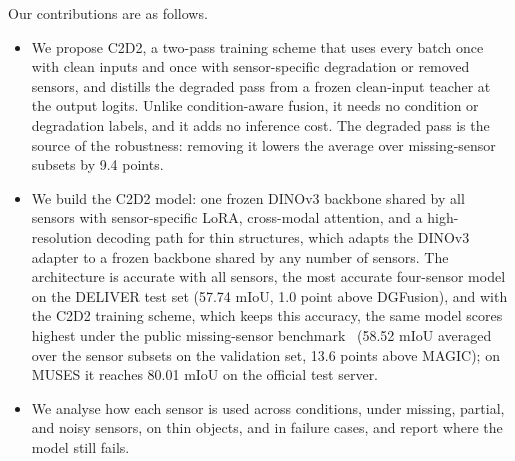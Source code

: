 Our contributions are as follows.
\begin{itemize}
\item We propose C2D2, a two-pass training scheme that uses every batch once with clean inputs and once with sensor-specific degradation or removed sensors, and distills the degraded pass from a frozen clean-input teacher at the output logits. Unlike condition-aware fusion, it needs no condition or degradation labels, and it adds no inference cost. The degraded pass is the source of the robustness: removing it lowers the average over missing-sensor subsets by 9.4 points.
\item We build the C2D2 model: one frozen DINOv3 backbone shared by all sensors with sensor-specific LoRA, cross-modal attention, and a high-resolution decoding path for thin structures, which adapts the DINOv3 adapter to a frozen backbone shared by any number of sensors. The architecture is accurate with all sensors, the most accurate four-sensor model on the DELIVER test set (57.74 mIoU, 1.0 point above DGFusion), and with the C2D2 training scheme, which keeps this accuracy, the same model scores highest under the public missing-sensor benchmark~\cite{mmssbench2025} (58.52 mIoU averaged over the sensor subsets on the validation set, 13.6 points above MAGIC); on MUSES it reaches 80.01 mIoU on the official test server.
\item We analyse how each sensor is used across conditions, under missing, partial, and noisy sensors, on thin objects, and in failure cases, and report where the model still fails. 
\end{itemize}
